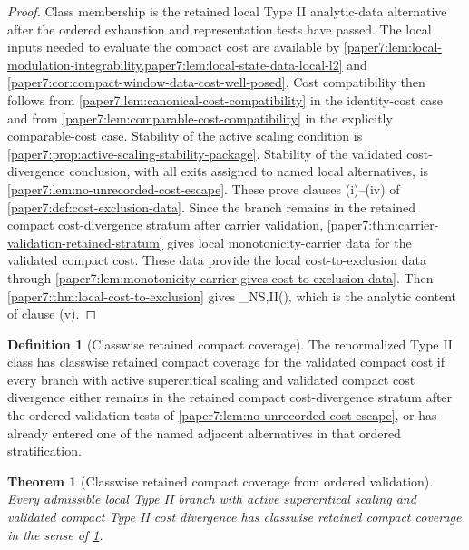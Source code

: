 \documentclass[11pt]{amsart}
\def\({}%
\def\){}%
\theoremstyle{plain}
\newtheorem{theorem}{Theorem}[section]
\theoremstyle{definition}
\newtheorem{definition}[definition]{Definition}
\theoremstyle{remark}
\begin{document}
\begin{proof}
Class membership is the retained local Type II analytic-data alternative after
the ordered exhaustion and representation tests have passed.
The local inputs needed to evaluate the compact cost are available by
\cref{paper7:lem:local-modulation-integrability,paper7:lem:local-state-data-local-l2}
and \cref{paper7:cor:compact-window-data-cost-well-posed}.  Cost compatibility
then follows from
\cref{paper7:lem:canonical-cost-compatibility} in the identity-cost case and
from \cref{paper7:lem:comparable-cost-compatibility} in the explicitly
comparable-cost case.  Stability of the active scaling condition is
\cref{paper7:prop:active-scaling-stability-package}.  Stability of the
validated cost-divergence conclusion, with all exits assigned to named local
alternatives, is \cref{paper7:lem:no-unrecorded-cost-escape}.  These prove
clauses \textup{(i)}--\textup{(iv)} of
\cref{paper7:def:cost-exclusion-data}.  Since the branch remains in the
retained compact cost-divergence stratum after carrier validation,
\cref{paper7:thm:carrier-validation-retained-stratum} gives local
monotonicity-carrier data for the validated compact cost.  These data provide
the local cost-to-exclusion data through
\cref{paper7:lem:monotonicity-carrier-gives-cost-to-exclusion-data}.  Then
\cref{paper7:thm:local-cost-to-exclusion} gives
\(\Pi_{\rm NS,II}(\omega)\), which is the analytic content of clause
\textup{(v)}.
\end{proof}

\begin{definition}[Classwise retained compact coverage]\label{paper7:def:classwise-retained-compact-coverage}
The renormalized Type II class has classwise retained compact coverage for the
validated compact cost if every branch with active supercritical scaling and
validated compact cost divergence either remains in the retained compact
cost-divergence stratum after the ordered validation tests of
\cref{paper7:lem:no-unrecorded-cost-escape}, or has already entered one of the
named adjacent alternatives in that ordered stratification.
\end{definition}

\begin{theorem}[Classwise retained compact coverage from ordered validation]
\label{paper7:thm:classwise-retained-compact-coverage}
Every admissible local Type II branch with active supercritical scaling and
validated compact Type II cost divergence has classwise retained compact
coverage in the sense of
\cref{paper7:def:classwise-retained-compact-coverage}.
\end{theorem}
\end{document}
